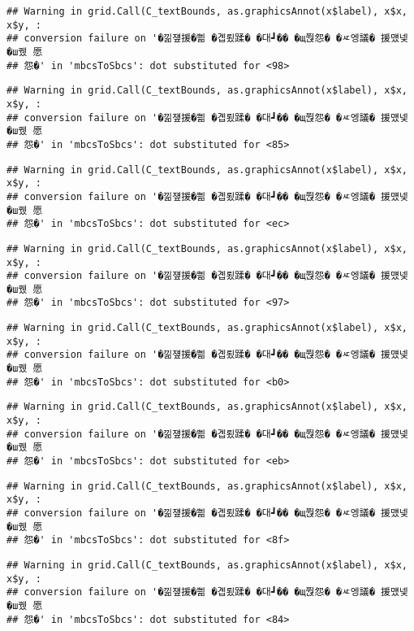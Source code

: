 \documentclass[
]{article}
\begin{document}
\begin{verbatim}
## Warning in grid.Call(C_textBounds, as.graphicsAnnot(x$label), x$x, x$y, :
## conversion failure on '�낆쟾援�쁾 �곕룄蹂� �대┛�� �щ쭩怨� �ㅼ엥議� 援먰넻�ш퀬 愿
## 怨�' in 'mbcsToSbcs': dot substituted for <98>
\end{verbatim}

\begin{verbatim}
## Warning in grid.Call(C_textBounds, as.graphicsAnnot(x$label), x$x, x$y, :
## conversion failure on '�낆쟾援�쁾 �곕룄蹂� �대┛�� �щ쭩怨� �ㅼ엥議� 援먰넻�ш퀬 愿
## 怨�' in 'mbcsToSbcs': dot substituted for <85>
\end{verbatim}

\begin{verbatim}
## Warning in grid.Call(C_textBounds, as.graphicsAnnot(x$label), x$x, x$y, :
## conversion failure on '�낆쟾援�쁾 �곕룄蹂� �대┛�� �щ쭩怨� �ㅼ엥議� 援먰넻�ш퀬 愿
## 怨�' in 'mbcsToSbcs': dot substituted for <ec>
\end{verbatim}

\begin{verbatim}
## Warning in grid.Call(C_textBounds, as.graphicsAnnot(x$label), x$x, x$y, :
## conversion failure on '�낆쟾援�쁾 �곕룄蹂� �대┛�� �щ쭩怨� �ㅼ엥議� 援먰넻�ш퀬 愿
## 怨�' in 'mbcsToSbcs': dot substituted for <97>
\end{verbatim}

\begin{verbatim}
## Warning in grid.Call(C_textBounds, as.graphicsAnnot(x$label), x$x, x$y, :
## conversion failure on '�낆쟾援�쁾 �곕룄蹂� �대┛�� �щ쭩怨� �ㅼ엥議� 援먰넻�ш퀬 愿
## 怨�' in 'mbcsToSbcs': dot substituted for <b0>
\end{verbatim}

\begin{verbatim}
## Warning in grid.Call(C_textBounds, as.graphicsAnnot(x$label), x$x, x$y, :
## conversion failure on '�낆쟾援�쁾 �곕룄蹂� �대┛�� �щ쭩怨� �ㅼ엥議� 援먰넻�ш퀬 愿
## 怨�' in 'mbcsToSbcs': dot substituted for <eb>
\end{verbatim}

\begin{verbatim}
## Warning in grid.Call(C_textBounds, as.graphicsAnnot(x$label), x$x, x$y, :
## conversion failure on '�낆쟾援�쁾 �곕룄蹂� �대┛�� �щ쭩怨� �ㅼ엥議� 援먰넻�ш퀬 愿
## 怨�' in 'mbcsToSbcs': dot substituted for <8f>
\end{verbatim}

\begin{verbatim}
## Warning in grid.Call(C_textBounds, as.graphicsAnnot(x$label), x$x, x$y, :
## conversion failure on '�낆쟾援�쁾 �곕룄蹂� �대┛�� �щ쭩怨� �ㅼ엥議� 援먰넻�ш퀬 愿
## 怨�' in 'mbcsToSbcs': dot substituted for <84>
\end{verbatim}
\end{document}
